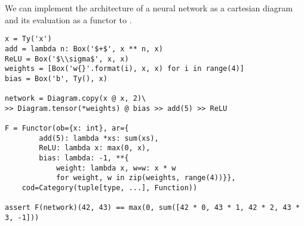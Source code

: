 \begin{example}
We can implement the architecture of a neural network as a cartesian diagram and its evaluation as a functor to .

\begin{verbatim}
x = Ty('x')
add = lambda n: Box('$+$', x ** n, x)
ReLU = Box('$\\sigma$', x, x)
weights = [Box('w{}'.format(i), x, x) for i in range(4)]
bias = Box('b', Ty(), x)

network = Diagram.copy(x @ x, 2)\
>> Diagram.tensor(*weights) @ bias >> add(5) >> ReLU

F = Functor(ob={x: int}, ar={
        add(5): lambda *xs: sum(xs),
        ReLU: lambda x: max(0, x),
        bias: lambda: -1, **{
            weight: lambda x, w=w: x * w
            for weight, w in zip(weights, range(4))}},
    cod=Category(tuple[type, ...], Function))

assert F(network)(42, 43) == max(0, sum([42 * 0, 43 * 1, 42 * 2, 43 * 3, -1]))
\end{verbatim}
\end{example}

